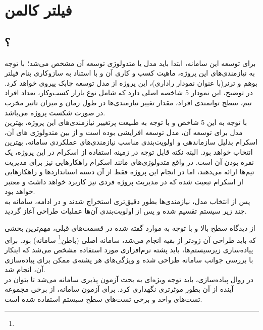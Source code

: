 \chapter{فیلتر کالمن}

\section{؟}

برای توسعه این سامانه، ابتدا باید مدل یا متدولوژی توسعه آن مشخص می‌شد؛ با توجه به نیازمندی‌های این پروژه، ماهیت کسب و کاری آن و با استناد به سازوکاری بنام فیلتر بوهم و ترنر(با عنوان نمودار راداری)، این پروژه از مدل توسعه چابک  پیروی خواهد کرد. در توضیح، این نمودار 5 شاخصه اصلی‌ دارد که شامل نوع بازار کسب‌وکار، تعداد افراد تیم، سطح توانمندی افراد، مقدار تغییر نیازمندی‌ها در طول زمان و میزان تاثیر مخرب در صورت شکست پروژه می‌باشد.\cite{reqeng}\\

 با توجه به این 5 شاخص و با توجه به طبیعت پرتغییر نیازمندی‌های این پروژه، بهترین مدل برای توسعه آن، مدل توسعه افزایشی  بوده است و از بین متدولوژی ‌های آن، اسکرام  بدلیل سازماندهی و اولویت‌بندی مناسب نیازمندی‌های عملکردی سامانه، بهترین انتخاب خواهد بود. البته نکته قابل توجه در زمینه استفاده از اسکرام در این پروژه، یک نفره بودن آن است. در واقع متدولوژی‌های مانند اسکرام راهکارهایی نیز برای مدیریت تیم‌ها ارائه می‌دهند، اما در انجام این پروژه فقط از آن دسته استانداردها و راهکارهایی از اسکرام تبعیت شده که در مدیریت پروژه فردی نیز کاربرد خواهد داشت و معتبر خواهد بود.\\
 
پس از انتخاب مدل، نیازمندی‌ها بطور دقیق‌تری استخراج شدند و در ادامه، سامانه به چند زیر سیستم تقسیم شده و پس از اولویت‌بندی آن‌ها عملیات طراحی آغاز گردید.

از دیدگاه سطح بالا و با توجه به موارد گفته شده در قسمت‌های قبلی، مهم‌ترین بخشی که باید طراحی آن زودتر از بقیه انجام می‌شد، سامانه اصلی (باطن\footnote{}  سامانه) بود. برای پیاده‌سازی زیرسیستم‌ها، باید پشته نرم‌افزاری مورد استفاده مشخص می‌شد که اینکار با بررسی جوانب سامانه طراحی شده و ویژگی‌های هر پشته‌ی ممکن برای پیاده‌سازی آن، انجام شد.\\

در روال پیاده‌سازی، باید توجه ویژه‌ای به بحث آزمون ‌پذیری سامانه می‌شد تا بتوان در آینده از آن بطور موثرتری نگهداری کرد. برای آزمون سامانه، از برخی مجموعه تست‌های واحد و برخی تست‌های سطح سیستم استفاده شده است.

\newpage


